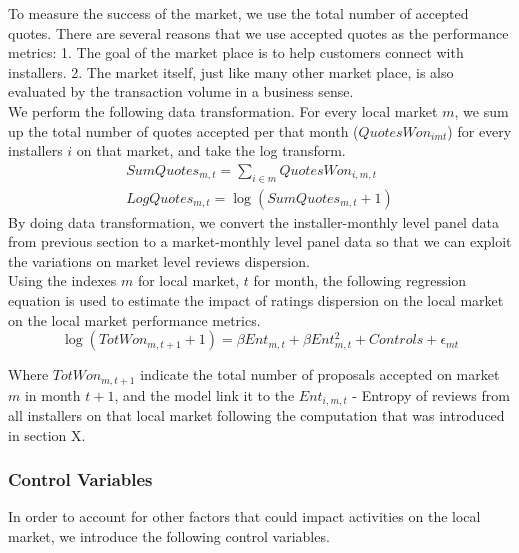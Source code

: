 \documentclass[msom,blindrev]{informs3}
\begin{document}
To measure the success of the market, we use the total number of accepted quotes. There are several reasons that we use accepted quotes as the performance metrics: 1. The goal of the market place is to help customers connect with installers. 2. The market itself, just like many other market place, is also evaluated by the transaction volume in a business sense. \\
We perform the following data transformation. For every local market $m$, we sum up the total number of quotes accepted per that month ($QuotesWon_{imt}$) for every installers $i$ on that market, and take the log transform. 
\begin{align*}
SumQuotes_{m,t}=\sum_{i\in m} QuotesWon_{i,m,t}\\
LogQuotes_{m,t}=\log (SumQuotes_{m,t}+1)
\end{align*}
By doing data transformation, we convert the installer-monthly level panel data from previous section to a market-monthly level panel data so that we can exploit the variations on market level reviews dispersion.  \\
Using the indexes $m$ for local market, $t$ for month, the following regression equation is used to estimate the impact of ratings dispersion on the local market on the local market performance metrics. 
\begin{equation}
    \log(TotWon_{m,t+1}+1)=\beta Ent_{m,t}+\beta Ent_{m,t}^2+Controls+\epsilon_{mt}
\end{equation}

Where $TotWon_{m,t+1}$ indicate the total number of proposals accepted on market $m$ in month $t+1$, and the model link it to the $Ent_{i,m,t}$ - Entropy of reviews from all installers on that local market following the computation that was introduced in section X.   


\subsubsection{Control Variables}
In order to account for other factors that could impact activities on the local market, we introduce the following control variables. 
\end{document}
